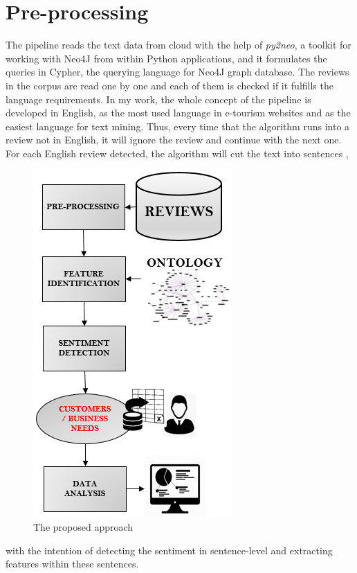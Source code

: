 \section{Pre-processing}
%
The pipeline reads the text data from cloud with the help of \textit{py2neo}, a toolkit for working with Neo4J from within Python applications, and it formulates the queries in Cypher, the querying language for Neo4J graph database. The reviews in the corpus are read one by one and each of them is checked if it fulfills the language requirements. In my work, the whole concept of the pipeline is developed in English, as the most used language in e-tourism websites and as the easiest language for text mining. Thus, every time that the algorithm runs into a review not in English, it will ignore the review and continue with the next one. For each English review detected, the algorithm will cut the text into sentences , 
\begin{figure}[h!]
	\centering
	\includegraphics[height=0.5\textheight]{pipe}
	\caption{The proposed approach}
	\label{fig:pipe}
\end{figure} 
with the intention of detecting the sentiment in sentence-level and extracting features within these sentences. 
